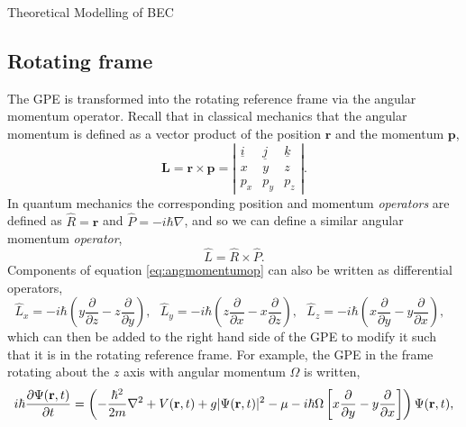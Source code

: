 \begin{chapter}{\label{cha:theoretical_model}Theoretical Modelling of BEC}
	\subsection{\label{section:rotatingframe} Rotating frame}
	The GPE is transformed into the rotating reference frame via the angular momentum operator. Recall that in classical mechanics that the angular momentum is defined as a vector product of the position $\mathbf{r}$ and the momentum $\mathbf{p}$,
	\begin{equation*}
		\mathbf{L} = \mathbf{r} \times \mathbf{p} = 
		\left| \begin{array}{ccc}
\underline{i} & \underline{j} & \underline{k} \\
x & y & z \\
p_x & p_y & p_z \end{array} \right|.
	\end{equation*}
	In quantum mechanics the corresponding position and momentum {\it operators} are defined as $\hat{R} = \mathbf{r}$ and $\hat{P} = -i\hbar\nabla$, and so we can define a similar angular momentum {\it operator},
	\begin{equation}\label{eq:angmomentumop}
		\hat{L} = \hat{R} \times \hat{P}.
	\end{equation}
	Components of equation \ref{eq:angmomentumop} can also be written as differential operators,
	\begin{equation}
		\hat{L}_x = -i\hbar\left ( y \frac{\partial}{\partial z} - z \frac{\partial}{\partial y} \right ),~~~
		\hat{L}_y = -i\hbar\left ( z \frac{\partial}{\partial x} - x \frac{\partial}{\partial z} \right ),~~~
		\hat{L}_z = -i\hbar\left ( x \frac{\partial}{\partial y} - y \frac{\partial}{\partial x} \right ),~~~
	\end{equation}
 which can then be added to the right hand side of the GPE to modify it such that it is in the rotating reference frame. For example, the GPE in the frame rotating about the $z$ axis with angular momentum $\Omega$ is written,
	\begin{equation}\label{eq:rotframegpe}
	i\hbar \frac{\partial\Psi({\bf r},t)}{\partial t} = \left(-\frac{\hbar^2}{2m}\nabla^2 + V({\bf r},t) + g|\Psi({\bf r},t)|^2 - \mu -i\hbar\Omega\left [ x \frac{\partial}{\partial y} - y \frac{\partial}{\partial x} \right ] \right ) \Psi({\bf r},t),
	\end{equation}


\end{chapter}
